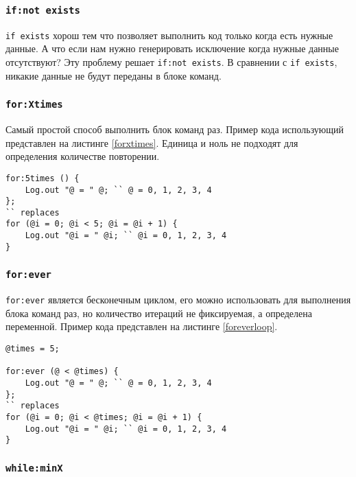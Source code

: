 \subsubsection{\lstinline|if:not exists|}

\lstinline|if exists| хорош тем что позволяет выполнить код только когда есть нужные данные. А что если нам нужно генерировать исключение когда нужные данные отсутствуют? Эту проблему решает \lstinline|if:not exists|. В сравнении с \lstinline|if exists|, никакие данные не будут переданы в блоке команд.

\subsubsection{\lstinline|for:Xtimes|}

Самый простой способ выполнить блок команд  раз. Пример кода использующий  представлен на листинге \ref{forxtimes}. Единица и ноль не подходят для определения количестве повторении.

\begin{lstlisting}[caption=Использование for:Xtimes, label=forxtimes]
for:5times () {
	Log.out "@ = " @; `` @ = 0, 1, 2, 3, 4
};
`` replaces
for (@i = 0; @i < 5; @i = @i + 1) {
	Log.out "@i = " @i; `` @i = 0, 1, 2, 3, 4
}
\end{lstlisting}

\subsubsection{\lstinline|for:ever|}

\lstinline|for:ever| является бесконечным циклом, его можно использовать для выполнения блока команд  раз, но количество итераций не фиксируемая, а определена переменной. Пример кода представлен на листинге \ref{foreverloop}.

\begin{lstlisting}[caption=Использование for:ever, label=foreverloop]
@times = 5;

for:ever (@ < @times) {
	Log.out "@ = " @; `` @ = 0, 1, 2, 3, 4
};
`` replaces
for (@i = 0; @i < @times; @i = @i + 1) {
	Log.out "@i = " @i; `` @i = 0, 1, 2, 3, 4
}
\end{lstlisting}

\subsubsection{\lstinline|while:minX|}

